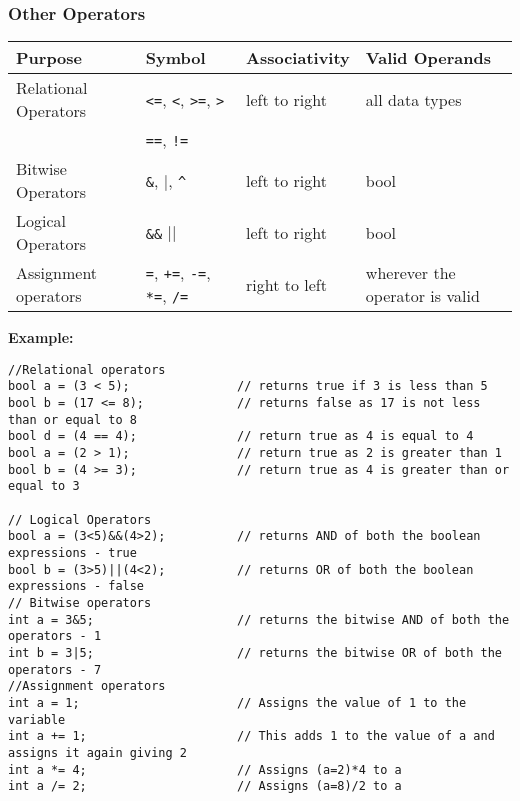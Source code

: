 \documentclass[english,a4paper,12pt]{report}
\begin{document}
\subsubsection{Other Operators}
\begin{center}
\renewcommand{\arraystretch}{1.5}%
\begin{tabular}{ |m{10em}|m{10em}|m{10em}|m{10em}| } 
\hline
Purpose & Symbol & Associativity & Valid Operands \\
\hline
Relational Operators & \verb|<=|, \verb|<|, \verb|>=|, \verb|>| & left to right & all data types\\
& \verb|==|, \verb|!=| &  &  \\
\hline
Bitwise Operators & \verb|&|, $|$, \verb|^|  & left to right & bool \\
\hline
Logical Operators & \verb|&&| $||$ & left to right & bool \\
\hline
Assignment operators & \verb|=|, \verb|+=|, \verb|-=|, \verb|*=|, \verb|/=| & right to left & wherever the
operator is valid\\
\hline

\end{tabular}
\end{center}
\textbf{Example:}
\begin{lstlisting}[style=CStyle]
//Relational operators
bool a = (3 < 5);               // returns true if 3 is less than 5
bool b = (17 <= 8);             // returns false as 17 is not less than or equal to 8
bool d = (4 == 4);              // return true as 4 is equal to 4
bool a = (2 > 1);               // return true as 2 is greater than 1
bool b = (4 >= 3);              // return true as 4 is greater than or equal to 3

// Logical Operators
bool a = (3<5)&&(4>2);          // returns AND of both the boolean expressions - true
bool b = (3>5)||(4<2);          // returns OR of both the boolean expressions - false     
// Bitwise operators
int a = 3&5;                    // returns the bitwise AND of both the operators - 1
int b = 3|5;                    // returns the bitwise OR of both the operators - 7
//Assignment operators
int a = 1;                      // Assigns the value of 1 to the variable
int a += 1;                     // This adds 1 to the value of a and assigns it again giving 2
int a *= 4;                     // Assigns (a=2)*4 to a
int a /= 2;                     // Assigns (a=8)/2 to a
\end{lstlisting}
\end{document}
